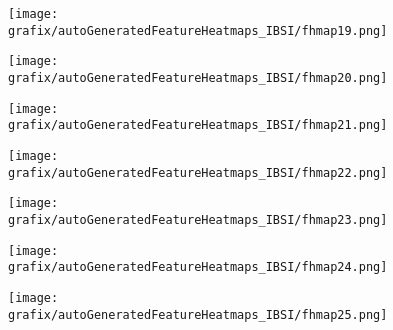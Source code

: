 \begin{subfigure}{\wid\textwidth} 
    \centering 
    \caption{\tiny \sffamily {}} 
    \vspace{\vsp} 
    \texttt{[image: grafix/autoGeneratedFeatureHeatmaps\_IBSI/fhmap19.png]} 
\end{subfigure} 
\hspace{\hsp} 
\begin{subfigure}{\wid\textwidth} 
    \centering 
    \caption{\tiny \sffamily {}} 
    \vspace{\vsp} 
    \texttt{[image: grafix/autoGeneratedFeatureHeatmaps\_IBSI/fhmap20.png]} 
\end{subfigure} 
\hspace{\hsp} 
\begin{subfigure}{\wid\textwidth} 
    \centering 
    \caption{\tiny \sffamily {}} 
    \vspace{\vsp} 
    \texttt{[image: grafix/autoGeneratedFeatureHeatmaps\_IBSI/fhmap21.png]} 
\end{subfigure} 
\hspace{\hsp} 
\begin{subfigure}{\wid\textwidth} 
    \centering 
    \caption{\tiny \sffamily {}} 
    \vspace{\vsp} 
    \texttt{[image: grafix/autoGeneratedFeatureHeatmaps\_IBSI/fhmap22.png]} 
\end{subfigure} 
\hspace{\hsp} 
\begin{subfigure}{\wid\textwidth} 
    \centering 
    \caption{\tiny \sffamily {}} 
    \vspace{\vsp} 
    \texttt{[image: grafix/autoGeneratedFeatureHeatmaps\_IBSI/fhmap23.png]} 
\end{subfigure} 
\hspace{\hsp} 
\begin{subfigure}{\wid\textwidth} 
    \centering 
    \caption{\tiny \sffamily {}} 
    \vspace{\vsp} 
    \texttt{[image: grafix/autoGeneratedFeatureHeatmaps\_IBSI/fhmap24.png]} 
\end{subfigure} 
\hspace{\hsp} 
\begin{subfigure}{\wid\textwidth} 
    \centering 
    \caption{\tiny \sffamily {}} 
    \vspace{\vsp} 
    \texttt{[image: grafix/autoGeneratedFeatureHeatmaps\_IBSI/fhmap25.png]} 
\end{subfigure} 
